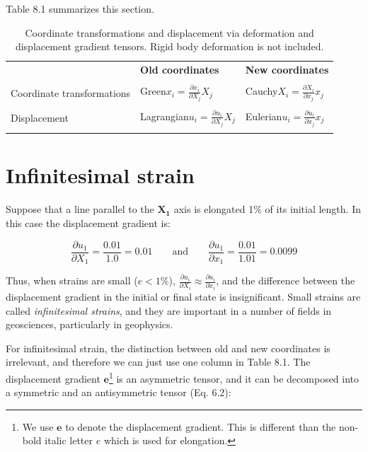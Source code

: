 \documentclass[a4paper , 12pt]{book}
\begin{document}
Table 8.1 summarizes this section.

\begin{table}[ht]
\small
\centering
\begin{tabular}{p{5cm} p{3.5cm} p{3.5cm}} 
 \hline\hline
 \textbf{} & \textbf{Old coordinates} & \textbf{New coordinates} \\ \\
 \hline
 Coordinate transformations & Green\newline$x_i=\frac{\partial x_i}{\partial X_j}X_j$ & Cauchy\newline$X_i=\frac{\partial X_i}{\partial x_j}x_j$ \\ \\
 Displacement & Lagrangian\newline$u_i=\frac{\partial u_i}{\partial X_j}X_j$ & Eulerian\newline$u_i=\frac{\partial u_i}{\partial x_j}x_j$ \\ \\
 \hline\hline
\end{tabular}
\caption{Coordinate transformations and displacement via deformation and displacement gradient tensors. Rigid body deformation is not included.}
\label{table8.1}
\end{table}

\section{Infinitesimal strain}\label{infStrain}

Suppose that a line parallel to the $\mathbf{X_1}$ axis is elongated 1$\%$ of its initial length. In this case the displacement gradient is:

\begin{equation*}
    \frac{\partial u_1}{\partial X_1} = \frac{0.01}{1.0} = 0.01 \quad\quad \text{and} \quad\quad \frac{\partial u_1}{\partial x_1} = \frac{0.01}{1.01} = 0.0099
\end{equation*}

Thus, when strains are small ($e < 1\%$), $\frac{\partial u_i}{\partial X_i} \approx \frac{\partial u_i}{\partial x_i}$, and the difference between the displacement gradient in the initial or final state is insignificant. Small strains are called \textit{infinitesimal strains}, and they are important in a number of fields in geosciences, particularly in geophysics.

For infinitesimal strain, the distinction between old and new coordinates is irrelevant, and therefore we can just use one column in Table 8.1. The displacement gradient $\mathbf{e}$\footnote{We use $\mathbf{e}$ to denote the displacement gradient. This is different than the non-bold italic letter $e$ which is used for elongation.} is an asymmetric tensor, and it can be decomposed into a symmetric and an antisymmetric tensor (Eq. 6.2):
\end{document}
